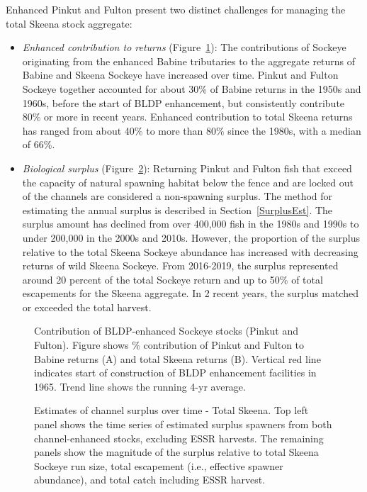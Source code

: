 \documentclass[french,11pt]{book}
\begin{document}
Enhanced Pinkut and Fulton present two distinct challenges for managing the total Skeena stock aggregate:
\begin{itemize}
\item
  \emph{Enhanced contribution to returns} (Figure~\ref{fig:ChannelContribution}): The contributions of Sockeye originating from the enhanced Babine tributaries to the aggregate returns of Babine and Skeena Sockeye have increased over time. Pinkut and Fulton Sockeye together accounted for about 30\% of Babine returns in the 1950s and 1960s, before the start of BLDP enhancement, but consistently contribute 80\% or more in recent years. Enhanced contribution to total Skeena returns has ranged from about 40\% to more than 80\% since the 1980s, with a median of 66\%.
\item
  \emph{Biological surplus} (Figure~\ref{fig:SurplusProduction}): Returning Pinkut and Fulton fish that exceed the capacity of natural spawning habitat below the fence and are locked out of the channels are considered a non-spawning surplus. The method for estimating the annual surplus is described in Section~\ref{SurplusEst}. The surplus amount has declined from over 400,000 fish in the 1980s and 1990s to under 200,000 in the 2000s and 2010s. However, the proportion of the surplus relative to the total Skeena Sockeye abundance has increased with decreasing returns of wild Skeena Sockeye. From 2016-2019, the surplus represented around 20 percent of the total Sockeye return and up to 50\% of total escapements for the Skeena aggregate. In 2 recent years, the surplus matched or exceeded the total harvest.
\end{itemize}

\begin{figure}[htb]

{\centering {} 

}

\caption{Contribution of BLDP-enhanced Sockeye stocks (Pinkut and Fulton). Figure shows \% contribution of Pinkut and Fulton to Babine returns (A) and total Skeena returns (B). Vertical red line indicates start of construction of BLDP enhancement facilities in 1965. Trend line shows the running 4-yr average.}\label{fig:ChannelContribution}
\end{figure}

\begin{figure}[htb]

{\centering {} 

}

\caption{Estimates of channel surplus over time - Total Skeena. Top left panel shows the time series of estimated surplus spawners from both channel-enhanced stocks, excluding ESSR harvests. The remaining panels show the magnitude of the surplus relative to total Skeena Sockeye run size, total escapement (i.e., effective spawner abundance), and total catch including ESSR harvest.}\label{fig:SurplusProduction}
\end{figure}
\clearpage
\end{document}
